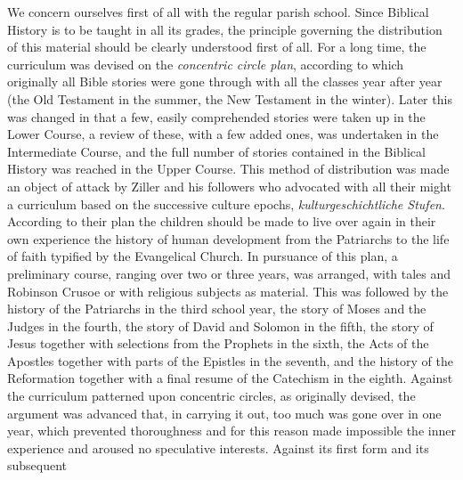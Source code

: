 We concern ourselves first of all with the regular parish school. Since Biblical History is to be taught in all its grades, the principle governing the distribution of this material should be clearly understood first of all. For a long time, the curriculum was devised on the \emph{concentric circle plan}, according to which originally all Bible stories were gone through with all the classes year after year (the Old Testament in the summer, the New Testament in the winter). Later this was changed in that a few, easily comprehended stories were taken up in the Lower Course, a review of these, with a few added ones, was undertaken in the Intermediate Course, and the full number of stories contained in the Biblical History was reached in the Upper Course. This method of distribution was made an object of attack by Ziller and his followers who advocated with all their might a curriculum based on the successive culture epochs, \emph{kulturgeschichtliche Stufen}. According to their plan the children should be made to live over again in their own experience the history of human development from the Patriarchs to the life of faith typified by the Evangelical Church. In pursuance of this plan, a preliminary course, ranging over two or three years, was arranged, with tales and Robinson Crusoe or with religious subjects as material. This was followed by the history of the Patriarchs in the third school year, the story of Moses and the Judges in the fourth, the story of David and Solomon in the fifth, the story of Jesus together with selections from the Prophets in the sixth, the Acts of the Apostles together with parts of the Epistles in the seventh, and the history of the Reformation together with a final resume of the Catechism in the eighth. Against the curriculum patterned upon concentric circles, as originally devised, the argument was advanced that, in carrying it out, too much was gone over in one year, which prevented thoroughness and for this reason made impossible the inner experience and aroused no speculative interests. Against its first form and its subsequent
